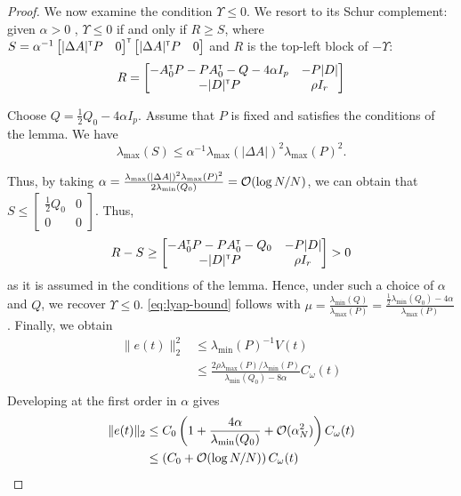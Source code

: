 \documentclass{article}
\begin{document}
\begin{proof}
We now examine the condition $\Upsilon \leq 0$.
We resort to its Schur complement: given $\alpha > 0$ , $\Upsilon \leq 0$ if and only if $R \geq S$, where $S= \alpha^{-1}\begin{bmatrix}|\Delta A|^{\mathsf{\scriptscriptstyle T}} P & 0\end{bmatrix}^{\mathsf{\scriptscriptstyle T}} \begin{bmatrix}|\Delta A|^{\mathsf{\scriptscriptstyle T}} P & 0\end{bmatrix}$ and $R$ is the top-left block of $-\Upsilon$:
\[R = \begin{bmatrix}
-A_0^{\mathsf{\scriptscriptstyle T}} P - P A_0^{\mathsf{\scriptscriptstyle T}} - Q - 4\alpha I_p & -P|D|\\
-|D|^{\mathsf{\scriptscriptstyle T}} P & \rho I_r\\
\end{bmatrix}\]

Choose $Q = \frac{1}{2}Q_0-4\alpha I_p$.
Assume that $P$ is fixed and satisfies the conditions of the lemma. We have $$\lambda_{\max}(S) \leq \alpha^{-1}\lambda_{\max}(|\Delta A|)^2\lambda_{\max}(P)^2.$$

Thus, by taking $\alpha = \frac{\lambda_{\max}(|\Delta A|)^2\lambda_{\max}(P)^2}{2\lambda_{\min}(Q_0)} = \mathcal{O}(\log N / N)$, we can obtain that $S \leq \begin{bmatrix}
\frac{1}{2}Q_0 & 0\\0 & 0
\end{bmatrix}$. Thus,
\[R-S \geq \begin{bmatrix}
-A_0^{\mathsf{\scriptscriptstyle T}} P - P A_0^{\mathsf{\scriptscriptstyle T}} - Q_0 & -P|D|\\
-|D|^{\mathsf{\scriptscriptstyle T}} P & \rho I_r\\
\end{bmatrix} > 0 \]
as it is assumed in the conditions of the lemma. Hence, under such a choice of $\alpha$ and $Q$, we recover $\Upsilon\leq 0$. \eqref{eq:lyap-bound} follows with $\mu = \frac{\lambda_{\min}(Q)}{\lambda_{\max}(P)} = \frac{\frac{1}{2}\lambda_{\min}(Q_0) - 4\alpha}{\lambda_{\max}(P)}$.
Finally, we obtain
\begin{align*}
\|e(t)\|_2^2 &\leq \lambda_{\min}(P)^{-1} V(t)\\
& \leq \frac{2\rho\lambda_{\max}(P)/\lambda_{\min}(P)}{\lambda_{\min}(Q_0) - 8\alpha} C_\omega(t)\\
\end{align*}
Developing at the first order in $\alpha$ gives
\begin{align*}
\|e(t)\|_2 &\leq C_0\left(1 + \frac{4\alpha}{\lambda_{\min}(Q_0)} + \mathcal{O}(\alpha_N^2)\right)C_\omega(t)\\
&\leq \left(C_0 + \mathcal{O}(\log N/N)\right)C_\omega(t)
\end{align*}
\end{proof}
\end{document}
